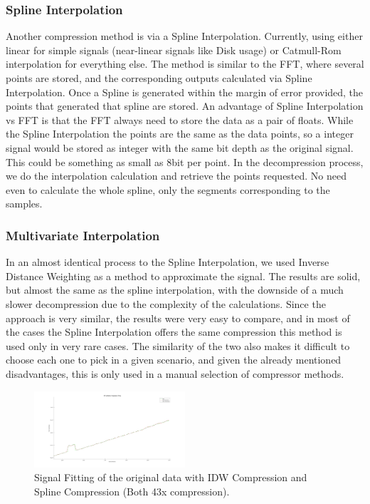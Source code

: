 \documentclass[conference]{IEEEtran}
\begin{document}
\subsubsection{Spline Interpolation}

Another compression method is via a Spline Interpolation. Currently, using either linear for simple signals (near-linear signals like Disk usage) or Catmull-Rom interpolation for everything else.
The method is similar to the FFT, where several points are stored, and the corresponding outputs calculated via Spline Interpolation.
Once a Spline is generated within the margin of error provided, the points that generated that spline are stored.
An advantage of Spline Interpolation vs FFT is that the FFT always need to store the data as a pair of floats. 
While the Spline Interpolation the points are the same as the data points, so a integer signal would be stored as integer with the same bit depth as the original signal.
This could be something as small as 8bit per point.
In the decompression process, we do the interpolation calculation and retrieve the points requested.
No need even to calculate the whole spline, only the segments corresponding to the samples.

\vspace{10pt}
\subsubsection{Multivariate Interpolation}

In an almost identical process to the Spline Interpolation, we used Inverse Distance Weighting as a method to approximate the signal.
The results are solid, but almost the same as the spline interpolation, with the downside of a much slower decompression due to the complexity of the calculations.
Since the approach is very similar, the results were very easy to compare, and in most of the cases the Spline Interpolation offers the same compression this method is used
only in very rare cases.
The similarity of the two also makes it difficult to choose each one to pick in a given scenario, and given the already mentioned disadvantages, this is only used in a manual selection of compressor methods.

\begin{figure}[ht]
  \centering
  \includegraphics[width=0.5\textwidth]{IDW_Spline_Comparison.png}
  \caption{Signal Fitting of the original data with IDW Compression and Spline Compression (Both 43x compression).}
  \label{Fig.4}
\end{figure}
\vspace{5pt}
\end{document}
